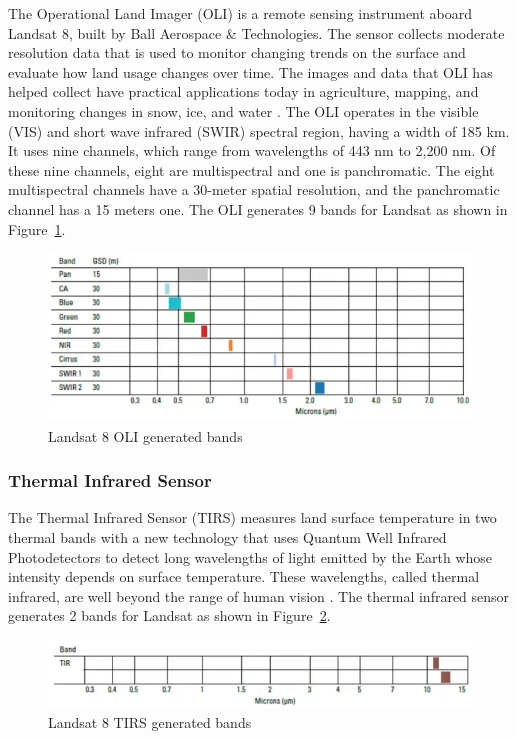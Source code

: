 \documentclass[11pt, a4paper]{report}
\begin{document}
	The Operational Land Imager (OLI) is a remote sensing instrument aboard Landsat 8, built by Ball Aerospace \& Technologies. The sensor collects moderate resolution data that is used to monitor changing trends on the surface and evaluate how land usage changes over time. The images and data that OLI has helped collect have practical applications today in agriculture, mapping, and monitoring changes in snow, ice, and water \cite{lolidcp}. 
	The OLI operates in the visible (VIS) and short wave infrared (SWIR) spectral region, having a width of 185 km. It uses nine channels, which range from wavelengths of 443 nm to 2,200 nm. Of these nine channels, eight are multispectral and one is panchromatic. The eight multispectral channels have a 30-meter spatial resolution, and the panchromatic channel has a 15 meters one.
	The OLI generates 9 bands for Landsat as shown in Figure~\ref{fig:L8OLI}.
	\begin{figure}[h]
		\centering
		\includegraphics[scale=0.5]{../images/Landsat8-OLI-Bands.png}
		\caption{Landsat 8 OLI generated bands \cite{l8otb}}
		\label{fig:L8OLI}
	\end{figure}
	
	\subsubsection{Thermal Infrared Sensor}
	
	The Thermal Infrared Sensor (TIRS) measures land surface temperature in two thermal bands with a new technology that uses Quantum Well Infrared Photodetectors to detect long wavelengths of light emitted by the Earth whose intensity depends on surface temperature. These wavelengths, called thermal infrared, are well beyond the range of human vision \cite{lgng}.
	The thermal infrared sensor generates 2 bands for Landsat as shown in Figure~\ref{fig:L8TIRS}.
	\begin{figure}[h]
		\centering
		\includegraphics[scale=0.5]{../images/Landsat8-TIRS-Bands.png}
		\caption{Landsat 8 TIRS generated bands \cite{l8otb}}
		\label{fig:L8TIRS}
	\end{figure}
	
\end{document}
